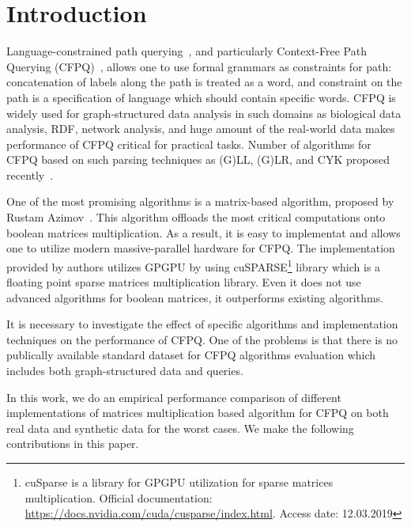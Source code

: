 \section{Introduction}

Language-constrained path querying~\cite{FLCpathProblem}, and particularly Context-Free Path Querying (CFPQ)~\cite{Yannakakis}, allows one to use formal grammars as constraints for path: concatenation of labels along the path is treated as a word, and constraint on the path is a specification of language which should contain specific words.
CFPQ is widely used for graph-structured data analysis in such domains as biological data analysis, RDF, network analysis, and huge amount of the real-world data makes performance of CFPQ critical for practical tasks.
Number of algorithms for CFPQ based on such parsing techniques as (G)LL, (G)LR, and CYK proposed recently~\cite{hellingsPathQuerying,Grigorev:2017:CPQ:3166094.3166104,Verbitskaia:2018:PCC:3241653.3241655,RDF,10.1007/978-3-319-91662-0_17,Medeiros:2018:EEC:3167132.3167265}.

One of the most promising algorithms is a matrix-based algorithm, proposed by Rustam Azimov~\cite{Azimov:2018:CPQ:3210259.3210264}.
This algorithm offloads the most critical computations onto boolean matrices multiplication.
As a result, it is easy to implementat and allows one to utilize modern massive-parallel hardware for CFPQ.
The implementation provided by authors utilizes GPGPU by using cuSPARSE\footnote{cuSparse is a library for GPGPU utilization for sparse matrices multiplication. Official documentation: \url{https://docs.nvidia.com/cuda/cusparse/index.html}. Access date: 12.03.2019} library which is a floating point sparse matrices multiplication library.
Even it does not use advanced algorithms for boolean matrices, it outperforms existing algorithms.

It is necessary to investigate the effect of specific algorithms and implementation techniques on the performance of CFPQ.
One of the problems is that there is no publically available standard dataset for CFPQ algorithms evaluation which includes both graph-structured data and queries.

In this work, we do an empirical performance comparison of different implementations of matrices multiplication based algorithm for CFPQ on both real data and synthetic data for the worst cases.
We make the following contributions in this paper.

